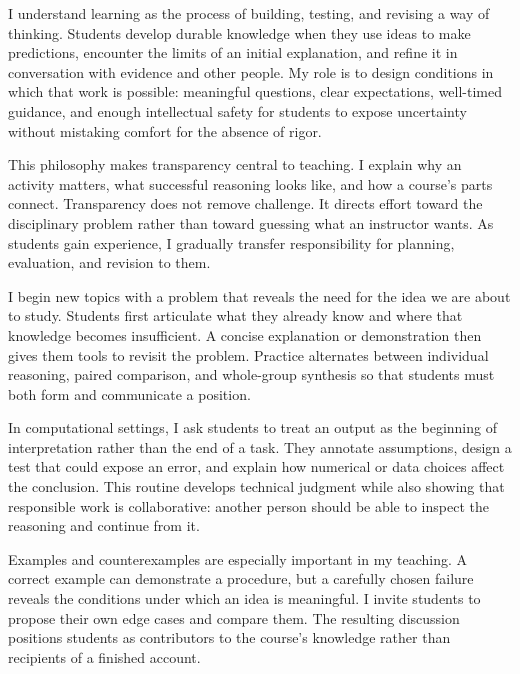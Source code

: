 \documentclass[type=teaching-philosophy]{careerdossier-statement}
\begin{document}
\MakeCDossierStatementHeader


I understand learning as the process of building, testing, and revising a way
of thinking. Students develop durable knowledge when they use ideas to make
predictions, encounter the limits of an initial explanation, and refine it in
conversation with evidence and other people. My role is to design conditions in
which that work is possible: meaningful questions, clear expectations,
well-timed guidance, and enough intellectual safety for students to expose
uncertainty without mistaking comfort for the absence of rigor.

This philosophy makes transparency central to teaching. I explain why an
activity matters, what successful reasoning looks like, and how a course's
parts connect. Transparency does not remove challenge. It directs effort toward
the disciplinary problem rather than toward guessing what an instructor wants.
As students gain experience, I gradually transfer responsibility for planning,
evaluation, and revision to them.


I begin new topics with a problem that reveals the need for the idea we are
about to study. Students first articulate what they already know and where that
knowledge becomes insufficient. A concise explanation or demonstration then
gives them tools to revisit the problem. Practice alternates between individual
reasoning, paired comparison, and whole-group synthesis so that students must
both form and communicate a position.

In computational settings, I ask students to treat an output as the beginning
of interpretation rather than the end of a task. They annotate assumptions,
design a test that could expose an error, and explain how numerical or data
choices affect the conclusion. This routine develops technical judgment while
also showing that responsible work is collaborative: another person should be
able to inspect the reasoning and continue from it.

Examples and counterexamples are especially important in my teaching. A correct
example can demonstrate a procedure, but a carefully chosen failure reveals the
conditions under which an idea is meaningful. I invite students to propose
their own edge cases and compare them. The resulting discussion positions
students as contributors to the course's knowledge rather than recipients of a
finished account.
\end{document}
